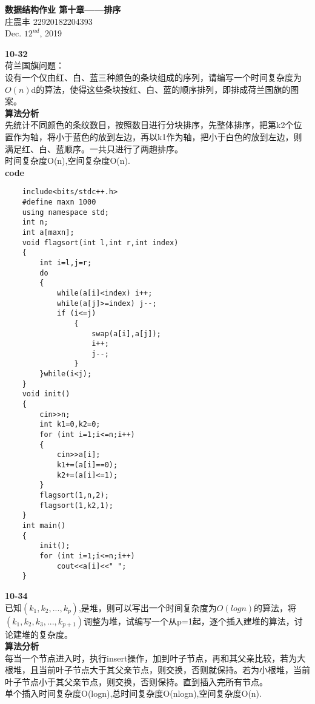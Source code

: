 \documentclass[UTF8,a4paper]{article}
\begin{document}
\begin{center}
    \textbf{\LARGE{数据结构作业 第十章——排序}}\\[0.5cm]
    \normalsize{庄震丰 22920182204393}\\[0.3cm]
    \large{Dec. $12^{nd}$, 2019}
\end{center}
\textbf{10-32}\\
荷兰国旗问题：\\
设有一个仅由红、白、蓝三种颜色的条块组成的序列，请编写一个时间复杂度为$O(n)$d的算法，使得这些条块按红、白、蓝的顺序排列，即排成荷兰国旗的图案。\\
\textbf{算法分析}\\
先统计不同颜色的条纹数目，按照数目进行分块排序，先整体排序，把第k2个位置作为轴，将小于蓝色的放到左边，再以k1作为轴，把小于白色的放到左边，则满足红、白、蓝顺序。一共只进行了两趟排序。\\
时间复杂度O(n),空间复杂度O(n).\\
\textbf{code}\\
\begin{lstlisting}
    include<bits/stdc++.h>
    #define maxn 1000
    using namespace std;
    int n;
    int a[maxn];
    void flagsort(int l,int r,int index)
    {
        int i=l,j=r;
        do
        {
            while(a[i]<index) i++;
            while(a[j]>=index) j--;
            if (i<=j)
                {
                    swap(a[i],a[j]);
                    i++;
                    j--;
                }
        }while(i<j);
    }
    void init()
    {
        cin>>n;
        int k1=0,k2=0;
        for (int i=1;i<=n;i++)
        {
            cin>>a[i];
            k1+=(a[i]==0);
            k2+=(a[i]<=1);
        }
        flagsort(1,n,2);
        flagsort(1,k2,1);
    }
    int main()
    {
        init();    
        for (int i=1;i<=n;i++)
            cout<<a[i]<<" ";
    }
\end{lstlisting}
\textbf{10-34}\\
已知$(k_1,k_2,...,k_p)$,是堆，则可以写出一个时间复杂度为$O(logn)$的算法，将$(k_1,k_2,k_3,...,k_{p+1})$调整为堆，试编写一个从p=1起，逐个插入建堆的算法，讨论建堆的复杂度。\\
\textbf{算法分析}\\
每当一个节点进入时，执行insert操作，加到叶子节点，再和其父亲比较，若为大根堆，且当前叶子节点大于其父亲节点，则交换，否则就保持。若为小根堆，当前叶子节点小于其父亲节点，则交换，否则保持。直到插入完所有节点。\\
单个插入时间复杂度O(logn),总时间复杂度O(nlogn),空间复杂度O(n).\\
\end{document}
